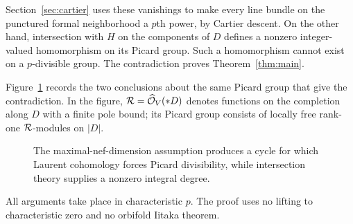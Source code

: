 Section~\ref{sec:cartier} uses these vanishings to make every line
bundle on the punctured formal neighborhood a $p$th power, by Cartier
descent.  On the other hand, intersection with $H$ on the components
of $D$ defines a nonzero integer-valued homomorphism on its Picard
group.  Such a homomorphism cannot exist on a $p$-divisible group.
The contradiction proves Theorem~\ref{thm:main}.

Figure~\ref{fig:proof-map} records the two conclusions about the same
Picard group that give the contradiction.  In the figure,
$\mathcal R=\widehat{\mathcal O}_V(*D)$ denotes functions on the completion along
$D$ with a finite pole bound; its Picard group consists of locally free
rank-one $\mathcal R$-modules on $|D|$.
\begin{figure}[ht]
\centering
\small
{}
\caption{The maximal-nef-dimension assumption produces a cycle for
which Laurent cohomology forces Picard divisibility, while intersection
theory supplies a nonzero integral degree.}
\label{fig:proof-map}
\end{figure}

All arguments take place in characteristic $p$.  The proof uses no
lifting to characteristic zero and no orbifold Iitaka theorem.

